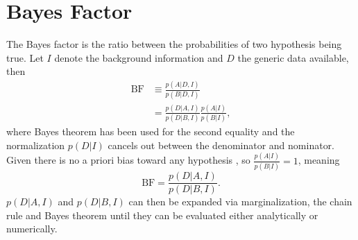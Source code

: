 \section{Bayes Factor}
The Bayes factor is the ratio between the probabilities of two hypothesis being true. Let $I$ denote the background information and $D$ the generic data available, then~\citep{Sivia2006,murphy2013machine}
\begin{equation}
	\begin{split}
		\text{BF} &\equiv \frac{p(A|D,I)}{p(B|D,I)}\\
		&= \frac{p(D|A,I)}{p(D|B,I)}\frac{p(A|I)}{p(B|I)},
	\end{split}
\end{equation}
where Bayes theorem has been used for the second equality and the normalization $p(D|I)$ cancels out between the denominator and nominator. Given there is no a priori bias toward any hypothesis , so $\frac{p(A|I)}{p(B|I)}=1$, meaning 
\begin{equation}
	\text{BF}= \frac{p(D|A,I)}{p(D|B,I)}.
\end{equation}
$p(D|A,I)$ and $p(D|B,I)$ can then be expanded via marginalization, the chain rule and Bayes theorem until they can be evaluated either analytically or numerically.


